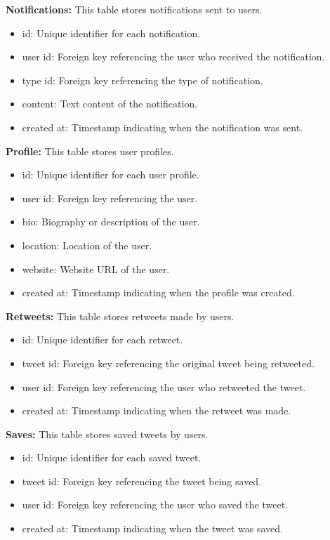\documentclass{article}
\begin{document}
\textbf{Notifications:} This table stores notifications sent to users.
\begin{itemize}[label=--]
    \item id: Unique identifier for each notification.
    \item user id: Foreign key referencing the user who received the notification.
    \item type id: Foreign key referencing the type of notification.
    \item content: Text content of the notification.
    \item created at: Timestamp indicating when the notification was sent.
\end{itemize}
\textbf{Profile:} This table stores user profiles.
\begin{itemize}[label=--]
    \item id: Unique identifier for each user profile.
    \item user id: Foreign key referencing the user.
    \item bio: Biography or description of the user.
    \item location: Location of the user.
    \item website: Website URL of the user.
    \item created at: Timestamp indicating when the profile was created.
\end{itemize}
\textbf{Retweets:} This table stores retweets made by users.
\begin{itemize}[label=--]
    \item id: Unique identifier for each retweet.
    \item tweet id: Foreign key referencing the original tweet being retweeted.
    \item user id: Foreign key referencing the user who retweeted the tweet.
    \item created at: Timestamp indicating when the retweet was made.
\end{itemize}
\textbf{Saves:} This table stores saved tweets by users.
\begin{itemize}[label=--]
    \item id: Unique identifier for each saved tweet.
    \item tweet id: Foreign key referencing the tweet being saved.
    \item user id: Foreign key referencing the user who saved the tweet.
    \item created at: Timestamp indicating when the tweet was saved.
\end{itemize}
\end{document}
